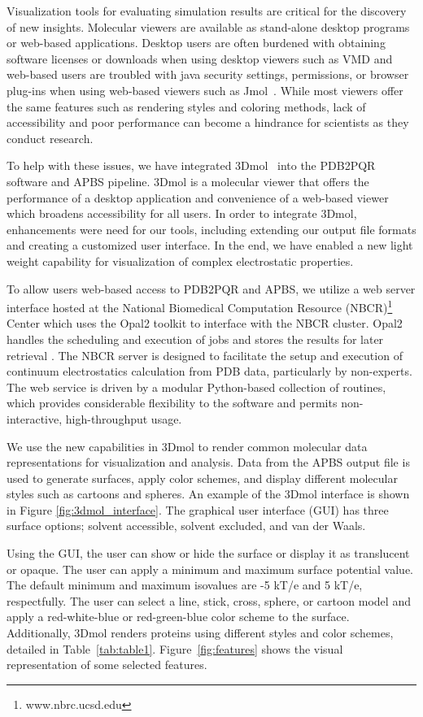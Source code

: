 \documentclass[11pt,titlepage]{article}
\begin{document}
Visualization tools for evaluating simulation results are critical for the discovery of new insights.  Molecular viewers are available as stand-alone desktop programs or web-based applications. Desktop users are often burdened with obtaining software licenses or downloads when using desktop viewers such as VMD and web-based users are troubled with java security settings, permissions, or browser plug-ins when using web-based viewers such as Jmol~\cite{herraez2006}. While most viewers offer the same features such as rendering styles and coloring methods, lack of accessibility and poor performance can become a hindrance for scientists as they conduct research. 

To help with these issues, we have integrated 3Dmol~\cite{rego2015} into the PDB2PQR software and APBS pipeline. 3Dmol is a molecular viewer that offers the performance of a desktop application and convenience of a web-based viewer which broadens accessibility for all users. In order to integrate 3Dmol, enhancements were need for our tools, including extending our output file formats and creating a customized user interface. In the end, we have enabled a new light weight capability for visualization of complex electrostatic properties.

To allow users web-based access to PDB2PQR and APBS, we utilize  a web server interface hosted at the National Biomedical Computation Resource (NBCR)\footnote{www.nbrc.ucsd.edu} Center which uses the Opal2 toolkit to interface with the NBCR cluster. Opal2 handles the scheduling and execution of jobs and stores the results for later retrieval  \cite{krishnan2009}.  The NBCR server is designed to facilitate the setup and execution of continuum electrostatics calculation from PDB data, particularly by non-experts. The web service is driven by a modular Python-based collection of routines, which provides considerable flexibility to the software and permits non-interactive, high-throughput usage. 

We use the new capabilities in 3Dmol to render common molecular data representations for visualization and analysis.  Data from the APBS output file is used to generate surfaces, apply color schemes, and display different molecular styles such as cartoons and spheres. An example of the 3Dmol interface is shown in Figure \ref{fig:3dmol_interface}. The graphical user interface (GUI) has three surface options; solvent accessible, solvent excluded, and van der Waals. 

Using the GUI, the user can show or hide the surface or display it as translucent or opaque. The user can apply a minimum and maximum surface potential value. The default minimum and maximum isovalues are -5 kT/e and 5 kT/e, respectfully. The user can select a line, stick, cross, sphere, or cartoon model and apply a red-white-blue or red-green-blue color scheme to the surface. Additionally, 3Dmol renders proteins using different styles and color schemes, detailed in Table~\ref{tab:table1}.
Figure~\ref{fig:features} shows the visual representation of some selected features.
\end{document}
